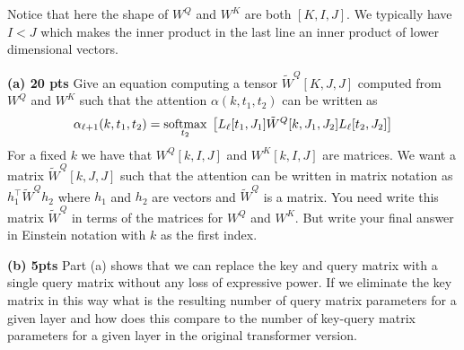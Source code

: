 \documentclass{article}
\begin{document}
Notice that here the shape of $W^Q$ and $W^K$ are both $[K,I,J]$.  We typically have $I < J$ which makes the inner product in the last line an inner product of lower dimensional vectors.

\medskip
{\bf(a) 20 pts} Give an equation computing a tensor $\tilde{W}^Q[K,J,J]$ computed from $W^Q$ and $W^K$ such that the attention $\alpha(k,t_1,t_2)$ can be written as
$$\alpha_{\ell+1}(k,t_1,t_2) = \operatorname*{softmax}_{t_2}\;\left[L_\ell[t_1,J_1]\tilde{W}^Q[k,J_1,J_2]L_\ell[t_2,J_2]\right]$$
For a fixed $k$ we have that $W^Q[k,I,J]$ and $W^K[k,I,J]$ are matrices.  We want a matrix $\tilde{W}^Q[k,J,J]$ such that the attention can be written in matrix notation as
$h_1^\top \tilde{W}^Q h_2$ where $h_1$ and $h_2$ are vectors and $\tilde{W}^Q$ is a matrix.
You need write this matrix $\tilde{W}^Q$ in terms of the matrices for $W^Q$ and $W^K$.  But write your final answer in Einstein notation with $k$ as the first index.


\medskip
{\bf (b) 5pts} Part (a) shows that we can replace the key and query matrix with a single query matrix without any loss of expressive power.  If we eliminate the key matrix in this way
what is the resulting number of query matrix parameters for a given layer and how does this compare to the number of key-query matrix parameters for a given layer in the original transformer version.

\end{document}
